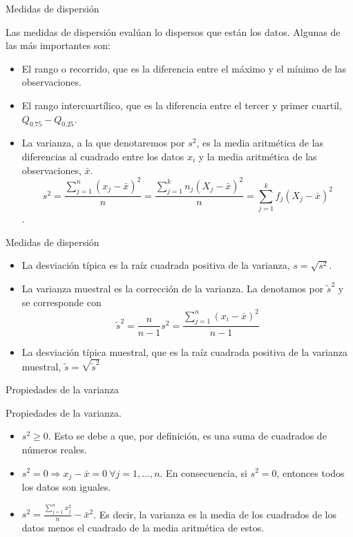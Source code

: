 \documentclass[
  ignorenonframetext,
]{beamer}
\providecommand{\tightlist}{%
  \setlength{\itemsep}{0pt}\setlength{\parskip}{0pt}}
\begin{document}
\begin{frame}{Medidas de dispersión}
\protect\hypertarget{medidas-de-dispersiuxf3n-1}{}

Las medidas de dispersión evalúan lo dispersos que están los datos.
Algunas de las más importantes son:

\begin{itemize}
\item
  El rango o recorrido, que es la diferencia entre el máximo y el mínimo
  de las observaciones.
\item
  El rango intercuartílico, que es la diferencia entre el tercer y
  primer cuartil, \(Q_{0.75}-Q_{0.25}\).
\item
  La varianza, a la que denotaremos por \(s^2\), es la media aritmética
  de las diferencias al cuadrado entre los datos \(x_i\) y la media
  aritmética de las observaciones, \(\bar{x}\).
  \[s^2 = \frac{\sum_{j=1}^n(x_j-\bar{x})^2}{n}=\frac{\sum_{j=1}^kn_j(X_j-\bar{x})^2}{n}=\sum_{j=1}^kf_j(X_j-\bar{x})^2\].
\end{itemize}

\end{frame}

\begin{frame}{Medidas de dispersión}
\protect\hypertarget{medidas-de-dispersiuxf3n-2}{}

\begin{itemize}
\item
  La desviación típica es la raíz cuadrada positiva de la varianza,
  \(s=\sqrt{s^2}\).
\item
  La varianza muestral es la corrección de la varianza. La denotamos por
  \(\tilde{s}^2\) y se corresponde con
  \[\tilde{s}^2 = \frac{n}{n-1}s^2 = \frac{\sum_{j=1}^n(x_i-\bar{x})^2}{n-1}\]
\item
  La desviación típica muestral, que es la raíz cuadrada positiva de la
  varianza muestral, \(\tilde{s} = \sqrt{\tilde{s}^2}\)
\end{itemize}

\end{frame}

\begin{frame}{Propiedades de la varianza}
\protect\hypertarget{propiedades-de-la-varianza}{}

Propiedades de la varianza.

\begin{itemize}
\tightlist
\item
  \(s^2\ge 0\). Esto se debe a que, por definición, es una suma de
  cuadrados de números reales.
\item
  \(s^2 = 0\Longrightarrow x_j-\bar{x}=0\ \forall j= 1,\dots,n\). En
  consecuencia, si \(s^2=0\), entonces todos los datos son iguales.
\item
  \(s^2 =\frac{\sum_{j=1}^nx_j^2}{n}-\bar{x}^2\). Es decir, la varianza
  es la media de los cuadrados de los datos menos el cuadrado de la
  media aritmética de estos.
\end{itemize}

\end{frame}
\end{document}
